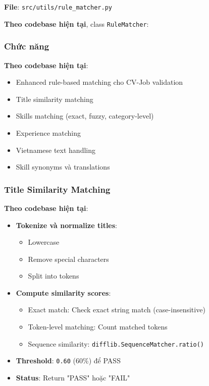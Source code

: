 \textbf{File}: \texttt{src/utils/rule\_matcher.py}

\textbf{Theo codebase hiện tại}, class \texttt{RuleMatcher}:

\subsubsection{Chức năng}

\textbf{Theo codebase hiện tại}:
\begin{itemize}
    \item Enhanced rule-based matching cho CV-Job validation
    \item Title similarity matching
    \item Skills matching (exact, fuzzy, category-level)
    \item Experience matching
    \item Vietnamese text handling
    \item Skill synonyms và translations
\end{itemize}

\subsubsection{Title Similarity Matching}

\textbf{Theo codebase hiện tại}:

\begin{itemize}
    \item \textbf{Tokenize và normalize titles}:
    \begin{itemize}
        \item Lowercase
        \item Remove special characters
        \item Split into tokens
    \end{itemize}
    
    \item \textbf{Compute similarity scores}:
    \begin{itemize}
        \item Exact match: Check exact string match (case-insensitive)
        \item Token-level matching: Count matched tokens
        \item Sequence similarity: \texttt{difflib.SequenceMatcher.ratio()}
    \end{itemize}
    
    \item \textbf{Threshold}: \texttt{0.60} (60\%) để PASS
    \item \textbf{Status}: Return "PASS" hoặc "FAIL"
\end{itemize}

